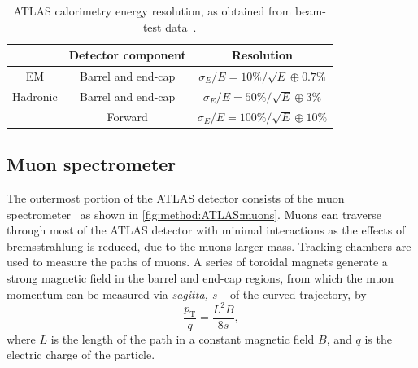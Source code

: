 \begin{table}
    \begin{tabular}{c|c|c}
         & Detector component & Resolution \\
        \midrule
       EM & Barrel and end-cap &  $\sigma_E/E = 10\%/\sqrt{E} \oplus 0.7\%$\\
        
       Hadronic & Barrel and end-cap & $\sigma_E/E = 50\%/\sqrt{E} \oplus 3\%$ \\
                & Forward &  $\sigma_E/E = 100\%/\sqrt{E} \oplus 10\%$\\
    \end{tabular}
    \caption[ATLAS calorimetry energy resolution]{ATLAS calorimetry energy resolution, as obtained from beam-test data~\cite{ATLAS:testbeam-calo,ATLAS:testbeam-hcal}.}
    \label{tab:method:ATLAS:ecalperf}
\end{table}

\subsection{Muon spectrometer}\label{sec:method:MS}

The outermost portion of the ATLAS detector consists of the muon spectrometer~\cite{ATLAS:muon-TDR} as shown in \cref{fig:method:ATLAS:muons}. Muons can traverse through most of the ATLAS detector with minimal interactions as the effects of bremsstrahlung is reduced, due to the muons larger mass. Tracking chambers are used to measure the paths of muons. A series of toroidal magnets generate a strong magnetic field in the barrel and end-cap regions, from which the muon momentum can be measured via \emph{sagitta, s} ~\cite{WeissteinSagitta} of the curved trajectory, by
\begin{equation}
    \frac{p_\text{T}}{q} = \frac{L^2B}{8s},
\end{equation}
where $L$ is the length of the path in a constant magnetic field $B$, and $q$ is the electric charge of the particle.

